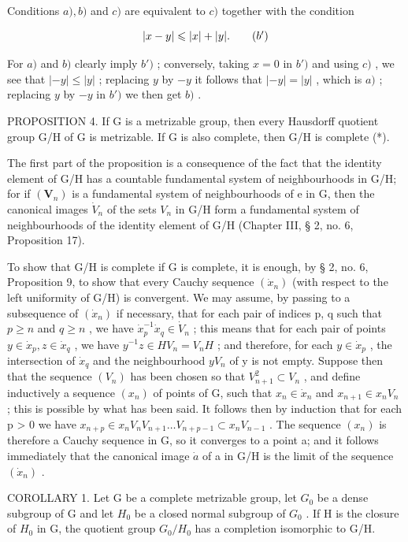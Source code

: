 Conditions \(a), b)\) and \(c)\) are equivalent to \(c)\) together with the condition

\[
| x - y | \leqslant | x | + | y |.\tag{\(b^{\prime}\)}
\]

For \(a)\) and \(b)\) clearly imply \(b')\) ; conversely, taking \(x = 0\) in \(b')\) and using \(c)\) , we see that \(|-y| \leqslant |y|\) ; replacing \(y\) by \(-y\) it follows that \(|-y| = |y|\) , which is \(a)\) ; replacing \(y\) by \(-y\) in \(b')\) we then get \(b)\) .

PROPOSITION 4. If G is a metrizable group, then every Hausdorff quotient group G/H of G is metrizable. If G is also complete, then G/H is complete (*).

The first part of the proposition is a consequence of the fact that the identity element of G/H has a countable fundamental system of neighbourhoods in G/H; for if \((\mathbf{V}_{n})\) is a fundamental system of neighbourhoods of e in G, then the canonical images \(\dot{V}_{n}\) of the sets \(V_{n}\) in G/H form a fundamental system of neighbourhoods of the identity element of G/H (Chapter III, § 2, no. 6, Proposition 17).

To show that G/H is complete if G is complete, it is enough, by § 2, no. 6, Proposition 9, to show that every Cauchy sequence \((\dot{x}_{n})\) (with respect to the left uniformity of G/H) is convergent. We may assume, by passing to a subsequence of \((\dot{x}_{n})\) if necessary, that for each pair of indices p, q such that \(p \geqslant n\) and \(q \geqslant n\) , we have \(\dot{x}_{p}^{-1}\dot{x}_{q} \in \dot{V}_{n}\) ; this means that for each pair of points \(y \in \dot{x}_{p}, z \in \dot{x}_{q}\) , we have \(y^{-1}z \in HV_{n} = V_{n}H\) ; and therefore, for each \(y \in \dot{x}_{p}\) , the intersection of \(\dot{x}_{q}\) and the neighbourhood \(yV_{n}\) of y is not empty. Suppose then that the sequence \((V_{n})\) has been chosen so that \(V_{n+1}^{2} \subset V_{n}\) , and define inductively a sequence \((x_{n})\) of points of G, such that \(x_{n} \in \dot{x}_{n}\) and \(x_{n+1} \in x_{n}V_{n}\) ; this is possible by what has been said. It follows then by induction that for each p \textgreater{} 0 we have \(x_{n+p} \in x_{n}V_{n}V_{n+1} \ldots V_{n+p-1} \subset x_{n}V_{n-1}\) . The sequence \((x_{n})\) is therefore a Cauchy sequence in G, so it converges to a point a; and it follows immediately that the canonical image \(\dot{a}\) of a in G/H is the limit of the sequence \((\dot{x}_{n})\) .

COROLLARY 1. Let G be a complete metrizable group, let \(G_{0}\) be a dense subgroup of G and let \(H_{0}\) be a closed normal subgroup of \(G_{0}\) . If H is the closure of \(H_{0}\) in G, the quotient group \(G_{0}/H_{0}\) has a completion isomorphic to G/H.

